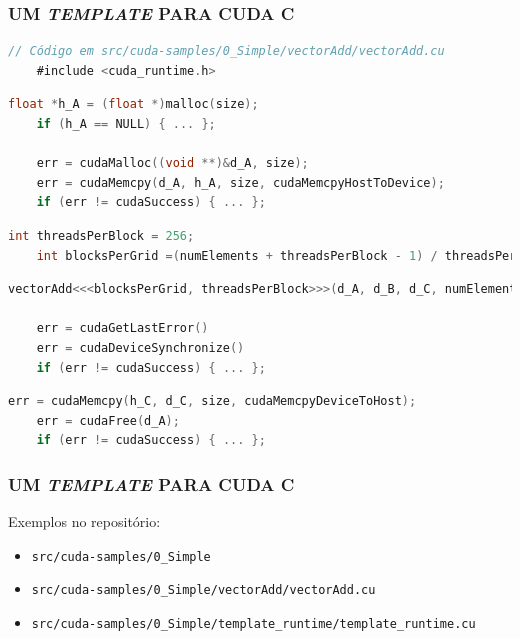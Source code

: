 \documentclass[10pt, compress]{beamer}
\begin{document}
\begin{frame}[fragile]
    \frametitle{UM \textit{TEMPLATE} PARA CUDA C}
    \begin{lstlisting}[basicstyle=\scriptsize, language=C]
    // Código em src/cuda-samples/0_Simple/vectorAdd/vectorAdd.cu
    #include <cuda_runtime.h>
    \end{lstlisting}
    \pause
    \begin{lstlisting}[basicstyle=\scriptsize, language=C]
    float *h_A = (float *)malloc(size);
    if (h_A == NULL) { ... };

    err = cudaMalloc((void **)&d_A, size);
    err = cudaMemcpy(d_A, h_A, size, cudaMemcpyHostToDevice);
    if (err != cudaSuccess) { ... };
    \end{lstlisting}
    \pause
    \begin{lstlisting}[basicstyle=\scriptsize, language=C]
    int threadsPerBlock = 256;
    int blocksPerGrid =(numElements + threadsPerBlock - 1) / threadsPerBlock;
    \end{lstlisting}
    \pause
    \begin{lstlisting}[basicstyle=\scriptsize, language=C]
    vectorAdd<<<blocksPerGrid, threadsPerBlock>>>(d_A, d_B, d_C, numElements);

    err = cudaGetLastError()
    err = cudaDeviceSynchronize()
    if (err != cudaSuccess) { ... };
    \end{lstlisting}
    \pause
    \begin{lstlisting}[basicstyle=\scriptsize, language=C]
    err = cudaMemcpy(h_C, d_C, size, cudaMemcpyDeviceToHost);
    err = cudaFree(d_A);
    if (err != cudaSuccess) { ... };
    \end{lstlisting}
\end{frame}

\begin{frame}
    \frametitle{UM \textit{TEMPLATE} PARA CUDA C}
    Exemplos no repositório:
    \small
    \begin{itemize}
        \item \texttt{src/cuda-samples/0\_Simple}
        \item \texttt{src/cuda-samples/0\_Simple/vectorAdd/vectorAdd.cu}
        \item \texttt{src/cuda-samples/0\_Simple/template\_runtime/template\_runtime.cu}
    \end{itemize}
\end{frame}
\end{document}
